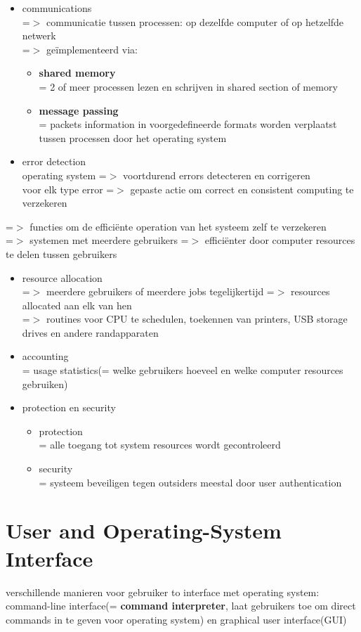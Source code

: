 \documentclass{report}
\begin{document}
\begin{itemize}
\item communications
\\=$>$ communicatie tussen processen: op dezelfde computer of op hetzelfde netwerk
\\=$>$ ge\"implementeerd via:
\begin{itemize}
\item \textbf{shared memory}
\\ = 2 of meer processen lezen en schrijven in shared section of memory
\item \textbf{message passing}
\\= packets information in voorgedefineerde formats worden verplaatst tussen processen door het operating system
\end{itemize}
\item error detection
\\ operating system =$>$ voortdurend errors detecteren en corrigeren
\\ voor elk type error =$>$ gepaste actie om correct en consistent computing te verzekeren
\end{itemize}
=$>$ functies om de effici\"ente operation van het systeem zelf te verzekeren
\\=$>$ systemen met meerdere gebruikers =$>$ effici\"enter door computer resources 
te delen tussen gebruikers
\begin{itemize}
\item resource allocation
\\=$>$ meerdere gebruikers of meerdere jobs tegelijkertijd =$>$ resources allocated aan elk van hen
\\=$>$ routines voor CPU te schedulen, toekennen van printers, USB storage drives en andere randapparaten
\item accounting
\\= usage statistics(= welke gebruikers hoeveel en welke computer resources gebruiken)
\item protection en security
\begin{itemize}
\item protection
\\= alle toegang tot system resources wordt gecontroleerd
\item security
\\= systeem beveiligen tegen outsiders meestal door user authentication
\end{itemize}
\end{itemize}

\section{User and Operating-System Interface}
verschillende manieren voor gebruiker to interface met operating system: command-line interface(= \textbf{command interpreter}, laat gebruikers toe om direct commands in te geven voor operating system) en graphical user interface(GUI)
\end{document}
